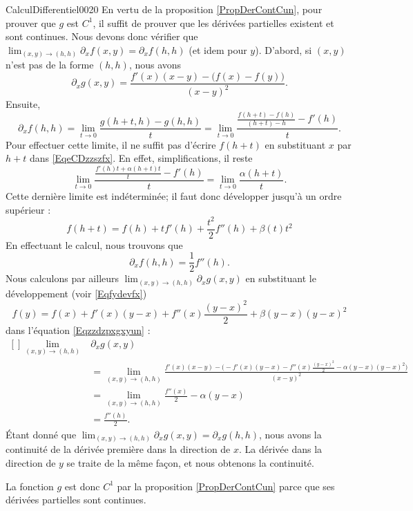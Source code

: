 \begin{corrige}{CalculDifferentiel0020}
	En vertu de la proposition \ref{PropDerContCun}, pour prouver que $g$ est $C^1$, il suffit de prouver que les dérivées partielles existent et sont continues. Nous devons donc vérifier que $\lim_{(x,y)\to(h,h)}\partial_xf(x,y)=\partial_xf(h,h)$ (et idem  pour $y$). D'abord, si $(x,y)$ n'est pas de la forme $(h,h)$, nous avons
	\begin{equation}		\label{Eqzzdzpxgxyun}
		\partial_xg(x,y)=\frac{ f'(x)(x-y)-\big( f(x)-f(y) \big) }{ (x-y)^2 }.
	\end{equation}
	Ensuite, 
	\begin{equation}
		\partial_xf(h,h)=\lim_{t\to 0} \frac{ g(h+t,h)-g(h,h) }{ t }=\lim_{t\to 0} \frac{ \frac{ f(h+t)-f(h) }{ (h+t)-h }-f'(h) }{ t }.
	\end{equation}
	Pour effectuer cette limite, il ne suffit pas d'écrire $f(h+t)$ en substituant $x$ par $h+t$ dans \eqref{EqeCDzzszfx}. En effet, simplifications, il reste
	\begin{equation}
		\lim_{t\to 0} \frac{ \frac{ f'(h)t+\alpha(h+t)t }{ t }-f'(h) }{ t }=\lim_{t\to 0} \frac{ \alpha(h+t) }{ t }.
	\end{equation}
	Cette dernière limite est indéterminée; il faut donc développer jusqu'à un ordre supérieur :
	\begin{equation}
		f(h+t)=f(h)+tf'(h)+\frac{ t^2 }{ 2 }f''(h)+\beta(t)t^2
	\end{equation}
	En effectuant le calcul, nous trouvons que
	\begin{equation}
		\partial_xf(h,h)=\frac{ 1 }{2}f''(h).
	\end{equation}
	Nous calculons par ailleurs $\lim_{(x,y)\to(h,h)}\partial_xg(x,y)$ en substituant le développement (voir \eqref{Eqfydevfx})
	\begin{equation}
		f(y)=f(x)+f'(x)(y-x)+f''(x)\frac{ (y-x)^2 }{2}+\beta(y-x)(y-x)^2
	\end{equation}
	dans l'équation \eqref{Eqzzdzpxgxyun} :
	\begin{equation}
		\begin{aligned}[]
			\lim_{(x,y)\to(h,h)}&\partial_xg(x,y)\\&=\lim_{(x,y)\to(h,h)}\frac{ f'(x)(x-y)-\Big( -f'(x)(y-x)-f''(x)\frac{ (y-x)^2 }{2}-\alpha(y-x)(y-x)^2 \Big) }{ (x-y)^2 }\\
			&=\lim_{(x,y)\to(h,h)}\frac{ f''(x) }{2}-\alpha(y-x)\\
			&=\frac{ f''(h) }{2}.
		\end{aligned}
	\end{equation}
	Étant donné que $\lim_{(x,y)\to(h,h)}\partial_xg(x,y)=\partial_xg(h,h)$, nous avons la continuité de la dérivée première dans la direction de $x$. La dérivée dans la direction de $y$ se traite de la même façon, et nous obtenons la continuité.

	La fonction $g$ est donc $C^1$ par la proposition \ref{PropDerContCun} parce que ses dérivées partielles sont continues.

\end{corrige}
